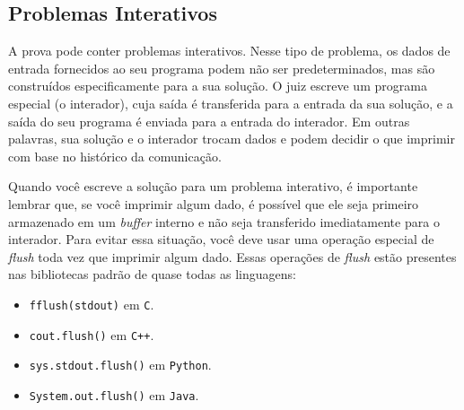 \subsection*{Problemas Interativos}

A prova pode conter problemas interativos. Nesse tipo de problema, os dados de entrada fornecidos ao seu programa podem não ser predeterminados, mas são construídos especificamente para a sua solução. O juiz escreve um programa especial (o interador), cuja saída é transferida para a entrada da sua solução, e a saída do seu programa é enviada para a entrada do interador. Em outras palavras, sua solução e o interador trocam dados e podem decidir o que imprimir com base no histórico da comunicação.

Quando você escreve a solução para um problema interativo, é importante lembrar que, se você imprimir algum dado, é possível que ele seja primeiro armazenado em um \textit{buffer} interno e não seja transferido imediatamente para o interador. Para evitar essa situação, você deve usar uma operação especial de \textit{flush} toda vez que imprimir algum dado. Essas operações de \textit{flush} estão presentes nas bibliotecas padrão de quase todas as linguagens:

\begin{itemize}
	\item \texttt{fflush(stdout)} em \texttt{C}.
	\item \texttt{cout.flush()} em \texttt{C++}.
	\item \texttt{sys.stdout.flush()} em \texttt{Python}.
	\item \texttt{System.out.flush()} em \texttt{Java}.
\end{itemize}
